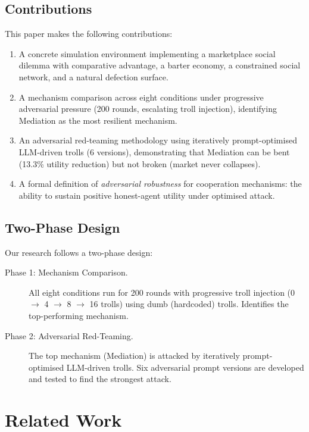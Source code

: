 \documentclass{article}
\begin{document}
\subsection{Contributions}

This paper makes the following contributions:

\begin{enumerate}
  \item A concrete simulation environment implementing a marketplace social dilemma with comparative advantage, a barter economy, a constrained social network, and a natural defection surface.
  \item A mechanism comparison across eight conditions under progressive adversarial pressure (200 rounds, escalating troll injection), identifying Mediation as the most resilient mechanism.
  \item An adversarial red-teaming methodology using iteratively prompt-optimised LLM-driven trolls (6 versions), demonstrating that Mediation can be bent (13.3\% utility reduction) but not broken (market never collapses).
  \item A formal definition of \textit{adversarial robustness} for cooperation mechanisms: the ability to sustain positive honest-agent utility under optimised attack.
\end{enumerate}

\subsection{Two-Phase Design}

Our research follows a two-phase design:

\begin{description}
  \item[Phase 1: Mechanism Comparison.] All eight conditions run for 200 rounds with progressive troll injection (0 $\to$ 4 $\to$ 8 $\to$ 16 trolls) using dumb (hardcoded) trolls. Identifies the top-performing mechanism.
  \item[Phase 2: Adversarial Red-Teaming.] The top mechanism (Mediation) is attacked by iteratively prompt-optimised LLM-driven trolls. Six adversarial prompt versions are developed and tested to find the strongest attack.
\end{description}

\section{Related Work}
\label{sec:related}
\end{document}
